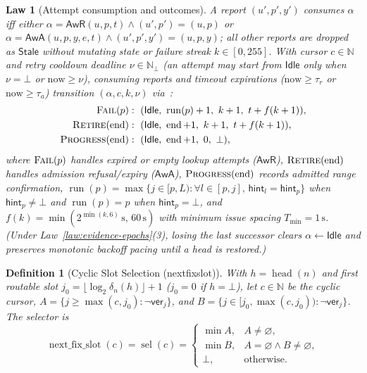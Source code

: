 \documentclass[journal]{IEEEtran}
\newtheorem{definition}{Definition}
\newtheorem{law}{Law}
\DeclareRobustCommand{\code}[1]{{\ttfamily\renewcommand{\_}{\textunderscore\allowbreak}#1}}
\begin{document}
\begin{law}[Attempt consumption and outcomes]\label{law:attempt-outcomes}
A report $(u',p',y')$ consumes $\alpha$ iff either $\alpha=\mathsf{AwR}(u,p,t)\land(u',p')=(u,p)$ or $\alpha=\mathsf{AwA}(u,p,y,e,t)\land(u',p',y')=(u,p,y)$; all other reports are dropped as $\mathsf{Stale}$ without mutating state or failure streak $k\in[0,255]$. With cursor $c\in\mathbb{N}$ and retry cooldown deadline $\nu\in\mathbb{N}_\bot$ (an attempt may start from $\mathsf{Idle}$ only when $\nu=\bot$ or $\mathrm{now}\ge\nu$), consuming reports and timeout expirations ($\mathrm{now}\ge\tau_r$ or $\mathrm{now}\ge\tau_a$) transition $(\alpha,c,k,\nu)$ via~\cite{Rhea2004}:
\begin{align*}
\textsc{Fail}(p)&:\ (\mathsf{Idle},\ \operatorname{run}(p)+1,\ k+1,\ t+f(k+1)),\\
\textsc{Retire}(\operatorname{end})&:\ (\mathsf{Idle},\ \operatorname{end}+1,\ k+1,\ t+f(k+1)),\\
\textsc{Progress}(\operatorname{end})&:\ (\mathsf{Idle},\ \operatorname{end}+1,\ 0,\ \bot),
\end{align*}
where $\textsc{Fail}(p)$ handles expired or empty lookup attempts ($\mathsf{AwR}$), $\textsc{Retire}(\operatorname{end})$ handles admission refusal/expiry ($\mathsf{AwA}$), $\textsc{Progress}(\operatorname{end})$ records admitted range confirmation, $\operatorname{run}(p)=\max\{j\in[p,L):\forall l\in[p,j],\,\mathsf{hint}_l=\mathsf{hint}_p\}$ when $\mathsf{hint}_p\neq\bot$ and $\operatorname{run}(p)=p$ when $\mathsf{hint}_p=\bot$, and $f(k)=\min(2^{\min(k,6)}\,\mathrm{s},\,60\,\mathrm{s})$ with minimum issue spacing $T_{\min}=1\,\mathrm{s}$. (Under Law~\ref{law:evidence-epochs}(3), losing the last successor clears $\alpha\gets\mathsf{Idle}$ and preserves monotonic backoff pacing until a head is restored.)
\end{law}

\begin{definition}[Cyclic Slot Selection (\code{next\_fix\_slot})]\label{def:next-fix-slot}
With $h=\operatorname{head}(n)$ and first routable slot $j_0=\lfloor\log_2\delta_n(h)\rfloor+1$ ($j_0=0$ if $h=\bot$), let $c\in\mathbb{N}$ be the cyclic cursor, $A=\{j\ge\max(c,j_0):\neg\mathsf{ver}_j\}$, and $B=\{j\in[j_0,\max(c,j_0)):\neg\mathsf{ver}_j\}$.  The selector is
\[
  \operatorname{next\_fix\_slot}(c)=\operatorname{sel}(c)=
  \begin{cases}
  \min A, & A\neq\varnothing,\\
  \min B, & A=\varnothing\land B\neq\varnothing,\\
  \bot, & \text{otherwise.}
  \end{cases}
\]
\end{definition}
\end{document}
